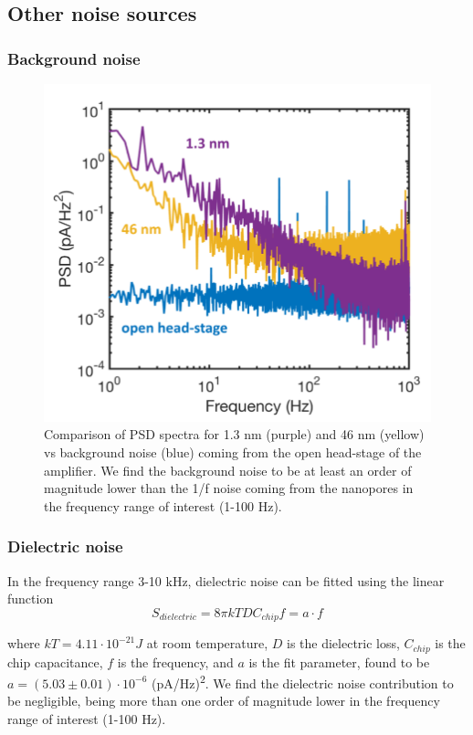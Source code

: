 \subsection{Other noise sources}\label{sec:S2.4.5}

\subsubsection{Background noise}

\begin{figure}[ht]
	\centering
	\includegraphics[width=0.7\linewidth]{figures/Figure2.7.png}
	\caption{Comparison of PSD spectra for 1.3 nm (purple) and 46 nm (yellow) vs background noise (blue) coming from the open head-stage of the amplifier. We find the background noise to be at least an order of magnitude lower than the 1/f noise coming from the nanopores in the frequency range of interest (1-100 Hz).}
	\label{fig:fig.2.7}
\end{figure}

\subsubsection{Dielectric noise}
In the frequency range 3-10 kHz, dielectric noise can be  fitted using the linear function
\begin{equation}\label{eqn:Eq2.32}
S_{dielectric}=8\pi kTDC_{chip}f=a\cdot f 
\end{equation}

\noindent where $kT=4.11\cdot10^{-21}J$ at room temperature, $D$ is the dielectric loss, $C_{chip}$ is the chip capacitance, $f$ is the frequency, and $a$ is the fit parameter, found to be $a=(5.03\pm 0.01)\cdot 10^{-6}$ (pA/Hz)\textsuperscript{2}. We find the dielectric noise contribution to be negligible, being more than one order of magnitude lower in the frequency range of interest (1-100 Hz). 


